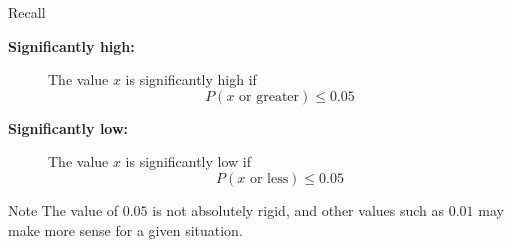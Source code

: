 \documentclass{beamer}
\newcommand{\prob}[1]{P\left(#1\right)}
\begin{document}
\begin{frame}
\begin{block}{Recall}
\begin{description}
\item[\textbf{Significantly high:}] The value $x$ is significantly high if 
\begin{equation*}
\prob{\text{$x$ or greater}}\leq 0.05
\end{equation*}
\item[\textbf{Significantly low:}] The value $x$ is significantly low if 
\begin{equation*}
\prob{\text{$x$ or less}}\leq 0.05
\end{equation*}
\end{description}
\end{block}\pause

\begin{block}{Note}
The value of $0.05$ is not absolutely rigid, and other values such as $0.01$ may make more sense for a given situation.
\end{block}
\end{frame}
\end{document}
